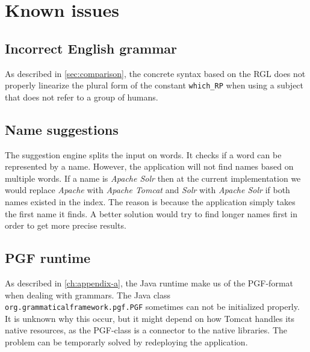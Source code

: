 \section{Known issues}\label{sec:known-issues}

%
\subsection*{Incorrect English grammar}
As described in \autoref{sec:comparison}, the concrete syntax based on the RGL does not properly linearize the plural form of the constant \texttt{which\_RP} when using a subject that does not refer to a group of humans.

\subsection*{Name suggestions}
The suggestion engine splits the input on words. It checks if a word can be represented by a name. However, the application will not find names based on multiple words. If a name is \emph{Apache Solr} then at the current implementation we would replace \emph{Apache} with \emph{Apache Tomcat} and \emph{Solr} with \emph{Apache Solr} if both names existed in the index. The reason is because the application simply takes the first name it finds. A better solution would try to find longer names first in order to get more precise results.

\subsection*{PGF runtime}
As described in \autoref{ch:appendix-a}, the Java runtime make us of the PGF-format when dealing with grammars. The Java class \texttt{org.grammaticalframework.pgf.PGF} sometimes can not be initialized properly. It is unknown why this occur, but it might depend on how Tomcat handles its native resources, as the PGF-class is a connector to the native libraries. The problem can be temporarly solved by redeploying the application.

